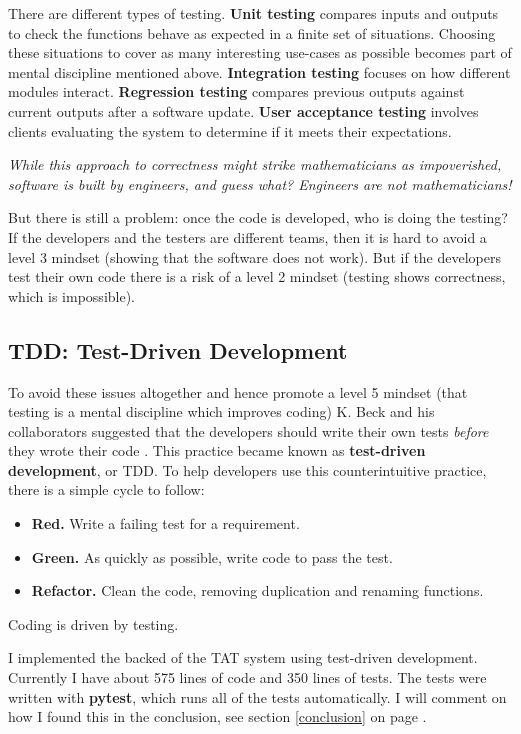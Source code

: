 \documentclass[10pt]{article}
\begin{document}
There are different types of testing. \textbf{Unit testing} compares inputs and outputs to check the functions behave as expected in a finite set of situations. Choosing these situations to cover as many interesting use-cases as possible becomes part of mental discipline mentioned above. \textbf{Integration testing} focuses on how different modules interact. \textbf{Regression testing} compares previous outputs against current outputs after a software update. \textbf{User acceptance testing} involves clients evaluating the system to determine if it meets their expectations.

\begin{center}
\emph{While this approach to correctness might strike mathematicians as impoverished, software is built by engineers, and guess what? Engineers are not mathematicians!} \cite[p. 98]{Amman16}
\end{center}

But there is still a problem: once the code is developed, who is doing the testing? If the developers and the testers are different teams, then it is hard to avoid a level 3 mindset (showing that the software does not work). But if the developers test their own code there is a risk of a level 2 mindset (testing shows correctness, which is impossible).

\subsection{TDD: Test-Driven Development}
To avoid these issues altogether and hence promote a level 5 mindset (that testing is a mental discipline which improves coding) K. Beck and his collaborators suggested that the developers should write their own tests \emph{before} they wrote their code \cite{Beck03}. This practice became known as \textbf{test-driven development}, or TDD. To help developers use this counterintuitive practice, there is a simple cycle to follow:
\begin{itemize}
\item \textbf{Red.} Write a failing test for a requirement.
\item \textbf{Green.} As quickly as possible, write code to pass the test.
\item \textbf{Refactor.} Clean the code, removing duplication and renaming functions.
\end{itemize}
Coding is driven by testing.

I implemented the backed of the TAT system using test-driven development. Currently I have about 575 lines of code and 350 lines of tests. The tests were written with \textbf{pytest}, which runs all of the tests automatically. I will comment on how I found this in the conclusion, see section \ref{conclusion} on page \pageref{conclusion}.
\end{document}
